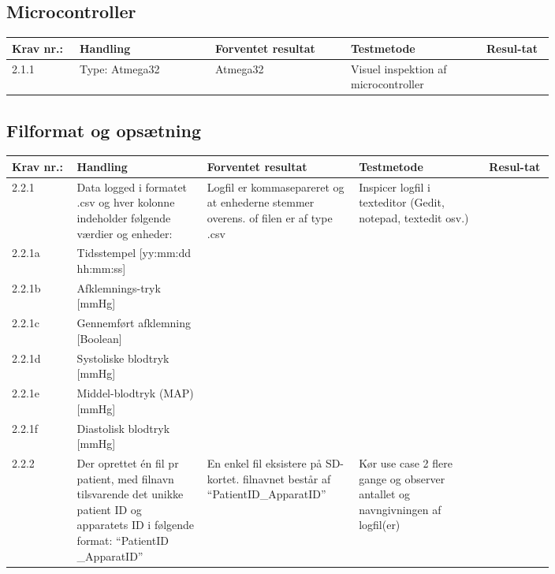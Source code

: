 			\subsection{Microcontroller}
				\begin{longtable}{|p{0.1\linewidth}|p{0.2\linewidth}|p{0.2\linewidth}|p{0.2\linewidth}|p{0.1\linewidth}|}
					\hline
					Krav nr.: & Handling & Forventet resultat & Testmetode & Resul-tat  \\\hline
					 2.1.1 & Type: Atmega32 & Atmega32 & Visuel inspektion af microcontroller & \\ \hline
				\end{longtable}
			
			\pagebreak
			\subsection{Filformat og opsætning}
				\begin{longtable}{|p{0.1\linewidth}|p{0.2\linewidth}|p{0.2\linewidth}|p{0.2\linewidth}|p{0.1\linewidth}|}
					\hline
					Krav nr.: & Handling & Forventet resultat & Testmetode & Resul-tat  \\\hline
					2.2.1 & Data logged i formatet .csv og hver kolonne indeholder følgende værdier og enheder:  & \multirow{7}{\linewidth}{Logfil er kommasepareret og at enhederne stemmer overens. of filen er af type .csv }&  \multirow{7}{\linewidth}{Inspicer logfil i texteditor (Gedit, notepad, textedit osv.)}& \multirow{7}{\linewidth}{} \\ \cline{1-2}
					2.2.1a& Tidsstempel [yy:mm:dd hh:mm:ss] & &  & \\ \cline{1-2}
					2.2.1b& Afklemnings-tryk [mmHg] & &  & \\ \cline{1-2}
					2.2.1c&  Gennemført afklemning [Boolean] & &  & \\ \cline{1-2}
					2.2.1d&  Systoliske blodtryk [mmHg] & &  & \\ \cline{1-2}
					2.2.1e&  Middel-blodtryk (MAP) [mmHg] & &  & \\ \cline{1-2}
					2.2.1f&  Diastolisk blodtryk [mmHg]  & &  & \\ \hline
					2.2.2 & Der oprettet én fil pr patient, med filnavn tilsvarende det unikke patient ID og apparatets ID i følgende format: “PatientID \_ApparatID”  & En enkel fil eksistere på SD-kortet. filnavnet består af “PatientID\_ApparatID” & Kør use case 2 flere gange og observer antallet og navngivningen af logfil(er)  & \\ \hline
				\end{longtable}
			

